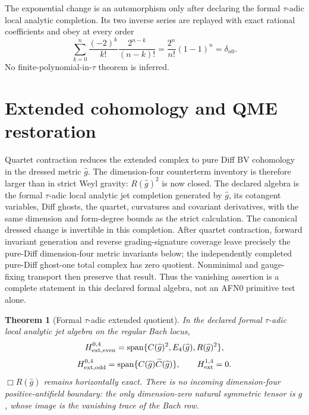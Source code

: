 \documentclass[11pt]{article}
\newtheorem{theorem}{Theorem}[section]
\theoremstyle{definition}
\theoremstyle{remark}
\newcommand{\ghat}{\widehat g}
\begin{document}
The exponential change is an automorphism only after declaring the formal
$\tau$-adic local analytic completion.  Its two inverse series are replayed with
exact rational coefficients and obey at every order
\[
 \sum_{k=0}^{n}\frac{(-2)^k}{k!}\frac{2^{n-k}}{(n-k)!}
 =\frac{2^n}{n!}(1-1)^n=\delta_{n0}.
\]
No finite-polynomial-in-$\tau$ theorem is inferred.

\section{Extended cohomology and QME restoration}

Quartet contraction reduces the extended complex to pure Diff BV cohomology
in the dressed metric $\ghat$.  The dimension-four counterterm inventory is
therefore larger than in strict Weyl gravity: $R(\ghat)^2$ is now closed.
The declared algebra is the formal $\tau$-adic local analytic jet completion
generated by $\widehat g$, its cotangent variables, Diff ghosts, the quartet,
curvatures and covariant derivatives, with the same dimension and form-degree
bounds as the strict calculation.  The canonical dressed change is invertible
in this completion.  After quartet contraction, forward invariant generation
and reverse grading-signature coverage leave precisely the pure-Diff
dimension-four metric invariants below; the independently completed pure-Diff
ghost-one total complex has zero quotient.  Nonminimal and gauge-fixing
transport then preserve that result.  Thus the vanishing assertion is a
complete statement in this declared formal algebra, not an AFN0 primitive
test alone.

\begin{theorem}[Formal $\tau$-adic extended quotient]
In the declared formal $\tau$-adic local analytic jet algebra on the regular
Bach locus,
\[
 H^{0,4}_{\rm ext,even}
 =\operatorname{span}\{C(\ghat)^2,E_4(\ghat),R(\ghat)^2\},
\]
\[
 H^{0,4}_{\rm ext,odd}
 =\operatorname{span}\{C(\ghat)\widetilde C(\ghat)\},
 \qquad H^{1,4}_{\rm ext}=0.
\]
$\Box R(\ghat)$ remains horizontally exact.  There is no incoming
dimension-four positive-antifield boundary: the only dimension-zero natural
symmetric tensor is $\ghat$, whose image is the vanishing trace of the Bach
row.
\end{theorem}
\end{document}
